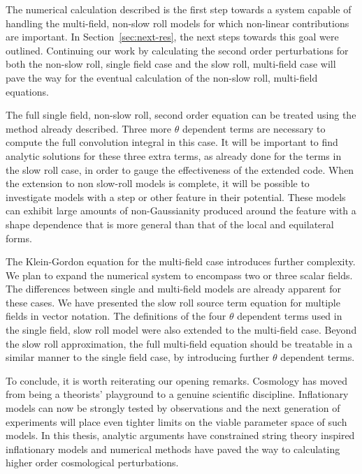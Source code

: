 The numerical calculation described is the first step towards a system capable of
handling the multi-field, non-slow roll models for which non-linear contributions
are important. In Section~\ref{sec:next-res}, the next steps towards this goal were
outlined. 
% 
Continuing our work by calculating the second order perturbations for both the
non-slow roll, single field case and the slow
roll, multi-field case will pave the way for the eventual calculation of the
non-slow roll, multi-field equations.
% 

The full single field, non-slow roll, second order equation can be treated using the
method already described. 
Three more $\theta$ dependent terms are necessary to
compute the full convolution integral in this case. It will be important to find
analytic solutions for these three extra terms, as already done for the terms in the
slow roll case, in
order to gauge the effectiveness of the extended code. When the extension to non slow-roll models
is complete, it will be possible to investigate models with a step or other feature in their
potential. These models can exhibit large amounts of non-Gaussianity produced around the feature
with a shape dependence that is more general than that of the local and equilateral forms. 

The Klein-Gordon equation for the multi-field case introduces further complexity. We plan to
expand the numerical system to encompass two or three scalar fields. The differences
between single and multi-field models are already apparent for these cases. We have
presented the slow roll source term equation for multiple fields in vector notation.
The definitions of the four $\theta$ dependent terms used in the single
field, slow roll model were also extended to the multi-field case. Beyond the slow
roll approximation, the full multi-field equation should be treatable in a similar
manner to the single field case, by introducing further $\theta$ dependent terms.



To conclude, it is worth reiterating our opening remarks. Cosmology has moved from
being a theorists' playground to a genuine scientific discipline. Inflationary models can
now be strongly tested by observations and the next generation of experiments will
place even tighter limits on the viable parameter space of such models. In this thesis, analytic
arguments have constrained string theory inspired inflationary models and numerical
methods have paved the way to calculating higher order cosmological perturbations.